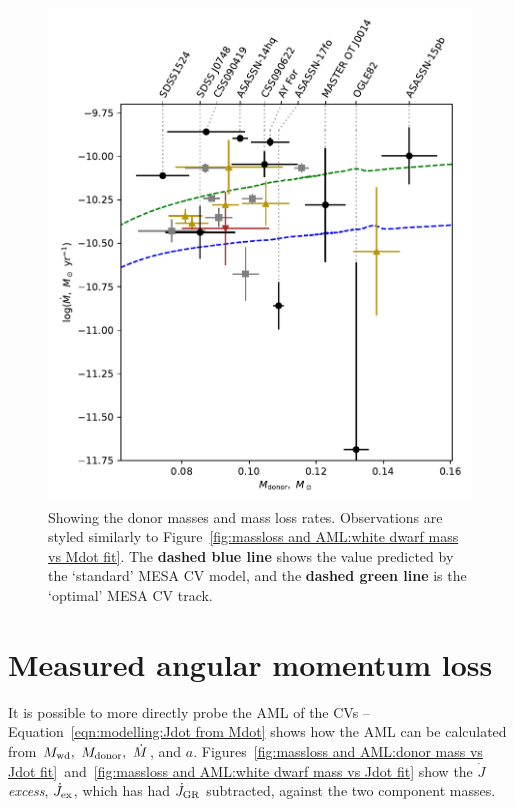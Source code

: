 \begin{figure}
    \centering
    \includegraphics[width=\textwidth]{figures/results/Mdot/Mr_Mdot_nofit.pdf}
    \caption{Showing the donor masses and mass loss rates. Observations are styled similarly to Figure~\ref{fig:massloss and AML:white dwarf mass vs Mdot fit}. The {\bf dashed blue line} shows the value predicted by the `standard' MESA CV model, and the {\bf dashed green line} is the `optimal' MESA CV track.}
    \label{fig:massloss and AML:donor mass vs Mdot fit}
\end{figure}



\newpage
\section{Measured angular momentum loss}
\label{sect:massloss and AML:measured angular momentum loss discussion}

It is possible to more directly probe the AML of the CVs -- Equation~\ref{eqn:modelling:Jdot from Mdot} shows how the AML can be calculated from $M_{\rm wd},\ M_{\rm donor},\ \dot M$, and $a$.
Figures~\ref{fig:massloss and AML:donor mass vs Jdot fit}~and~\ref{fig:massloss and AML:white dwarf mass vs Jdot fit} show the $\dot J$ \textit{excess}, $\dot J_{\rm ex}$, which has had $\dot J_{\rm GR}$ subtracted, against the two component masses.

